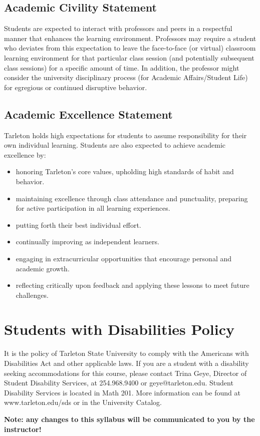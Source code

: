 \documentclass[10pt]{article}
\begin{document}
\subsection*{Academic Civility Statement}
\label{sec-9-2}
Students are expected to interact with professors and peers in a respectful manner that enhances the learning environment. Professors may require a student who deviates from this expectation to leave the face-to-face (or virtual) classroom learning environment for that particular class session (and potentially subsequent class sessions) for a specific amount of time. In addition, the professor might consider the university disciplinary process (for Academic Affairs/Student Life) for egregious or continued disruptive behavior.

\subsection*{Academic Excellence Statement}
\label{sec-9-3}
Tarleton holds high expectations for students to assume responsibility for their own individual learning. Students are also expected to achieve academic excellence by:
\begin{itemize}
\item honoring Tarleton’s core values, upholding high standards of habit and behavior.
\item maintaining excellence through class attendance and punctuality, preparing for active participation in all learning experiences.
\item putting forth their best individual effort.
\item continually improving as independent learners.
\item engaging in extracurricular opportunities that encourage personal and academic growth.
\item reflecting critically upon feedback and applying these lessons to meet future challenges.
\end{itemize}

\section*{Students with Disabilities Policy}
\label{sec-10}

It is the policy of Tarleton State University to comply with the Americans
with Disabilities Act and other applicable laws. If you are a student with a
disability seeking accommodations for this course, please contact Trina
Geye, Director of Student Disability Services, at 254.968.9400 or
geye@tarleton.edu. Student Disability Services is
located in Math 201. More information can be found at www.tarleton.edu/sds or in the University Catalog.


\textbf{\textbf{Note:  any changes to this syllabus will be communicated to you by the instructor!}}
\end{document}
